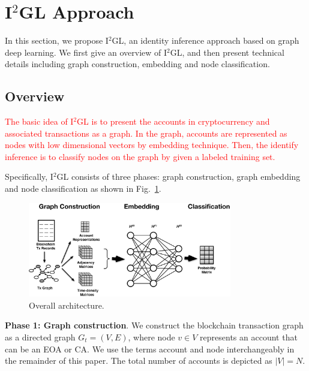 \section{I$^2$GL Approach}
\label{sec:approach}
In this section, we propose I$^2$GL, an identity inference approach based on graph deep learning. We first give an overview of I$^2$GL, and then present technical details including graph construction, embedding and node classification.


\subsection{Overview}
\label{subsec:methodology}
\textcolor{red}{The basic idea of I$^2$GL is to present the accounts in cryptocurrency and associated transactions as a graph. In the graph, accounts are represented as nodes with low dimensional vectors by embedding technique. Then, the identify inference is to classify nodes on the graph by given a labeled training set.}

Specifically, I$^2$GL consists of three phases: graph construction, graph embedding and node classification as shown in Fig.~\ref{fig:architecture}.

\begin{figure}[htbp]
	\centering
	\includegraphics[width=3.5in]{fig/architecture.eps}
	\caption{Overall architecture.}
	\label{fig:architecture}
\end{figure}

\textbf{Phase 1: Graph construction}. We construct the blockchain transaction graph as a directed graph $G_{t}=(V,E)$, where node $v \in V$ represents an account that can be an EOA or CA. We use the terms account and node interchangeably in the remainder of this paper. The total number of accounts is depicted as $|V|=N$.

